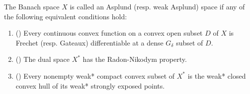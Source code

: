 \begin{definition}
  \label{def:analysis:asplund:asplund_space}
  The Banach space $X$ is called an Asplund (resp. weak Asplund) space if any of the following equivalent conditions hold:

  \begin{enumerate}
    \item(\cite[23]{Phelps1993}) Every continuous convex function on a convex open subset $D$ of $X$ is Frechet (resp. Gateaux) differentiable at a dense $G_\delta$ subset of $D$.
    \item(\cite[82]{Phelps1993}) The dual space $X^*$ has the Radon-Nikodym property.
    \item(\cite[86]{Phelps1993}) Every nonempty weak* compact convex subset of $X^*$ is the weak* closed convex hull of its weak* strongly exposed points.
  \end{enumerate}
\end{definition}
